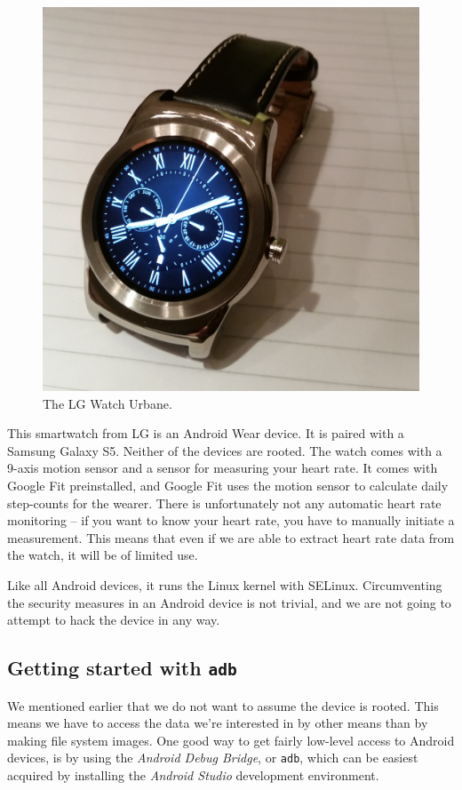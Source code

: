 \documentclass[a4paper,11pt,dvips]{article}
\begin{document}
\begin{figure}
\begin{center}
\includegraphics[natwidth=1000bp,natheight=1019bp,width=0.8\linewidth]{urbane}
\end{center}
\caption{The LG Watch Urbane.}
\label{fig:urbane}
\end{figure}

This smartwatch from LG is an Android Wear device. It is paired with a Samsung Galaxy S5. Neither of the devices are rooted. The watch comes with a 9-axis motion sensor and a sensor for measuring your heart rate. It comes with Google Fit preinstalled, and Google Fit uses the motion sensor to calculate daily step-counts for the wearer. There is unfortunately not any automatic heart rate monitoring -- if you want to know your heart rate, you have to manually initiate a measurement. This means that even if we are able to extract heart rate data from the watch, it will be of limited use.

Like all Android devices, it runs the Linux kernel with SELinux. Circumventing the security measures in an Android device is not trivial, and we are not going to attempt to hack the device in any way.


\subsection{Getting started with \texttt{adb}}

We mentioned earlier that we do not want to assume the device is rooted. This means we have to access the data we're interested in by other means than by making file system images. One good way to get fairly low-level access to Android devices, is by using the \textit{Android Debug Bridge}, or \texttt{adb}, which can be easiest acquired by installing the \textit{Android Studio} development environment.
\end{document}
